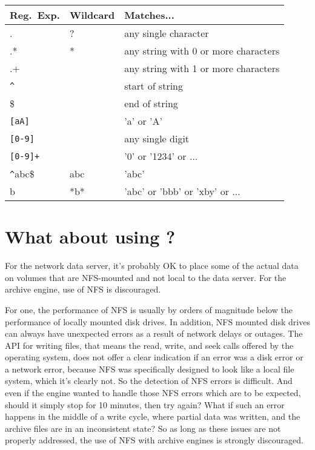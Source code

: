 \begin{center}
\begin{tabular}{l|l|l}
Reg.\ Exp.    &   Wildcard  &   Matches...  \\
\hline 
.             &   ?         &   any single character \\
.*            &   *         &   any string with 0 or more characters \\
.+            &             &   any string with 1 or more characters \\
\verb!^!      &             &   start of string \\
\$            &             &   end of string \\
\verb![aA]!   &             &   'a' or 'A' \\
\verb![0-9]!  &             &   any single digit \\
\verb![0-9]+! &             &   '0' or '1234' or ... \\
\verb!^!abc\$ &   abc       &   'abc' \\
b             &   *b*       &   'abc' or 'bbb' or 'xby' or ... \\
\end{tabular}
\end{center}

\section{What about using ?}
For the network data server, it's probably OK to place some of the actual data
on volumes that are NFS-mounted and not local to the data server.
For the archive engine, use of NFS is discouraged.

For one, the performance of NFS is usually by orders of magnitude below
the performance of locally mounted disk drives.
In addition, NFS mounted disk drives can always have unexpected errors
as a result of network delays or outages.
The API for writing files, that means the read, write, and seek calls offered
by the operating system, does not offer a clear indication if an error
was a disk error or a network error, because NFS was specifically designed
to look like a local file system, which it's clearly not.
So the detection of NFS errors is difficult. And even if the engine wanted
to handle those NFS errors which are to be expected, should it simply stop
for 10 minutes, then try again? What if such an error happens in the middle
of a write cycle, where partial data was written, and the archive files are
in an inconsistent state?
So as long as these issues are not properly addressed, the use of NFS with
archive engines is strongly discouraged.


